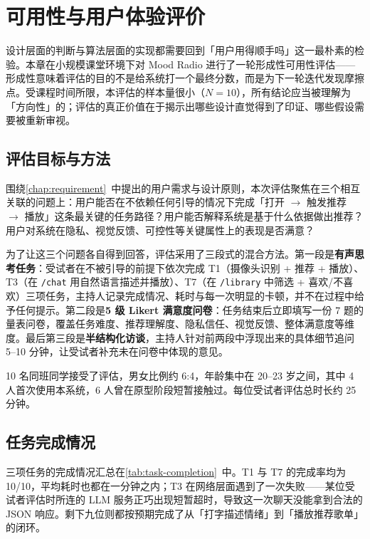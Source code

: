 \chapter{可用性与用户体验评价}\label{chap:evaluation}

设计层面的判断与算法层面的实现都需要回到「用户用得顺手吗」这一最朴素的检验。本章在小规模课堂环境下对 Mood Radio 进行了一轮形成性可用性评估——形成性意味着评估的目的不是给系统打一个最终分数，而是为下一轮迭代发现摩擦点。受课程时间所限，本评估的样本量很小（$N = 10$），所有结论应当被理解为「方向性」的；评估的真正价值在于揭示出哪些设计直觉得到了印证、哪些假设需要被重新审视。

\section{评估目标与方法}

围绕\cref{chap:requirement}~中提出的用户需求与设计原则，本次评估聚焦在三个相互关联的问题上：用户能否在不依赖任何引导的情况下完成「打开 $\to$ 触发推荐 $\to$ 播放」这条最关键的任务路径？用户能否解释系统是基于什么依据做出推荐？用户对系统在隐私、视觉反馈、可控性等关键属性上的表现是否满意？

为了让这三个问题各自得到回答，评估采用了三段式的混合方法。第一段是\textbf{有声思考任务}：受试者在不被引导的前提下依次完成 T1（摄像头识别 + 推荐 + 播放）、T3（在 \texttt{/chat} 用自然语言描述并播放）、T7（在 \texttt{/library} 中筛选 + 喜欢/不喜欢）三项任务，主持人记录完成情况、耗时与每一次明显的卡顿，并不在过程中给予任何提示。第二段是\textbf{5 级 Likert 满意度问卷}：任务结束后立即填写一份 7 题的量表问卷，覆盖任务难度、推荐理解度、隐私信任、视觉反馈、整体满意度等维度。最后第三段是\textbf{半结构化访谈}，主持人针对前两段中浮现出来的具体细节追问 5--10 分钟，让受试者补充未在问卷中体现的意见。

10 名同班同学接受了评估，男女比例约 6:4，年龄集中在 20--23 岁之间，其中 4 人首次使用本系统，6 人曾在原型阶段短暂接触过。每位受试者评估总时长约 25 分钟。

\section{任务完成情况}

三项任务的完成情况汇总在\cref{tab:task-completion}~中。T1 与 T7 的完成率均为 10/10，平均耗时也都在一分钟之内；T3 在网络层面遇到了一次失败——某位受试者评估时所连的 LLM 服务正巧出现短暂超时，导致这一次聊天没能拿到合法的 JSON 响应。剩下九位则都按预期完成了从「打字描述情绪」到「播放推荐歌单」的闭环。

